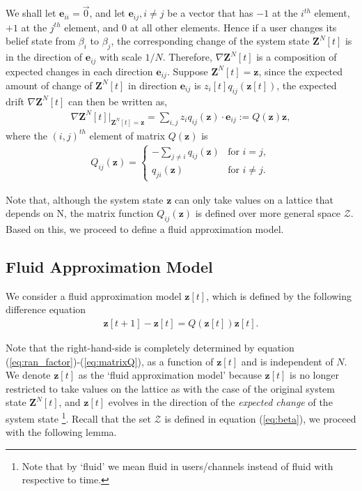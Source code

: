 \documentclass[11pt,twocolumn]{IEEEtran}
\begin{document}
We shall let $\bm e_{ii}=\vec{0}$, and let $\bm e_{ij}, i\neq j$ be a vector that has $-1$ at the $i^{th}$ element, $+1$ at the $j^{th}$ element, and $0$ at all other elements. Hence if a user changes its belief state from $\beta_i$ to $\beta_j$, the corresponding change of the system state $\bm Z^N[t]$ is in the direction of $\bm e_{ij}$ with scale $1/N$. Therefore, $\nabla \bm Z^N[t]$ is a composition of expected changes in each direction $\bm e_{ij}$. Suppose $\bm Z^N[t]= \bm z$, since the expected amount of change of $\bm Z^N[t]$ in direction $\bm e_{ij}$ is $z_i[t] q_{ij}(\bm z[t])$, the expected drift $\nabla \bm Z^N[t]$ can then be written as,
\begin{align}
\nabla \bm Z^N[t] \Big|_{\bm Z^N[t]=\bm z} =\sum_{i,j} z_i q_{ij}(\bm z) \cdot \bm e_{ij} := Q(\bm z)\bm z, \label{eq:dir_comp}
\end{align}
where the $(i,j)^{th}$ element of matrix $Q(\bm z)$ is
\begin{align}
\label{eq:matrixQ}
Q_{ij}(\bm z)= \begin{cases}
-\sum_{j\neq i}q_{ij}(\bm z) &\text{for $i=j$},\\
q_{ji}(\bm z) &\text{for $i\neq j$}.
\end{cases}
\end{align}

Note that, although the system state $\bm z$ can only take values on a lattice that depends on N, the matrix function $Q_{ij}(\bm z)$ is defined over more general space $\mathcal{Z}$. Based on this, we proceed to define a fluid approximation model.

\subsection{Fluid Approximation Model}

We consider a fluid approximation model $\bm z[t]$, which is defined by the following difference equation
\begin{align}
\label{eq:fluid}
\bm z[t+1]-\bm z[t]= Q(\bm z[t])\bm z[t].
\end{align}

Note that the right-hand-side is completely determined by equation (\ref{eq:ran_factor})-(\ref{eq:matrixQ}), as a function of $\bm z[t]$ and is independent of $N$. We denote $\bm z[t]$ as the `fluid approximation model' because $\bm z[t]$ is no longer restricted to take values on the lattice as with the case of the original system state $\bm Z^N[t]$, and $\bm z[t]$ evolves in the direction of the \emph{expected change} of the system state \footnote{Note that by `fluid' we mean fluid in users/channels instead of fluid with respective to time.}. Recall that the set $\mathcal{Z}$ is defined in equation (\ref{eq:beta}), we proceed with the following lemma.
\end{document}
